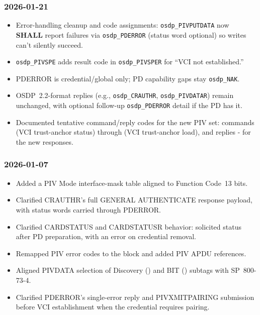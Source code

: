 \subsubsection*{2026-01-21}
\begin{itemize}
  \item Error-handling cleanup and code assignments: \texttt{osdp\_PIVPUTDATA} now \textbf{SHALL}
    report failures via \texttt{osdp\_PDERROR} (status word optional) so writes can’t silently
    succeed.
  \item \texttt{osdp\_PIVSPE} adds result code  in \texttt{osdp\_PIVSPER} for “VCI not
    established.”
  \item PDERROR is credential/global only; PD capability gaps stay \texttt{osdp\_NAK}.
  \item OSDP~2.2-format replies (e.g., \texttt{osdp\_CRAUTHR}, \texttt{osdp\_PIVDATAR}) remain
    unchanged, with optional follow-up \texttt{osdp\_PDERROR} detail if the PD has it.
  \item Documented tentative command/reply codes for the new PIV set: commands  (VCI
    trust-anchor status) through  (VCI trust-anchor load), and replies
    - for the new responses.
\end{itemize}

\subsubsection*{2026-01-07}
\begin{itemize}
  \item Added a PIV Mode interface-mask table aligned to Function Code~13 bits.
  \item Clarified CRAUTHR's full GENERAL AUTHENTICATE response payload, with status words carried
    through PDERROR.
  \item Clarified CARDSTATUS and CARDSTATUSR behavior: solicited status after PD preparation, with
    an error on credential removal.
  \item Remapped PIV error codes to the  block and added PIV APDU references.
  \item Aligned PIVDATA selection of Discovery () and BIT () subtags with
    SP~800-73-4.
  \item Clarified PDERROR's single-error reply and PIVXMITPAIRING submission before VCI
    establishment when the credential requires pairing.
\end{itemize}

